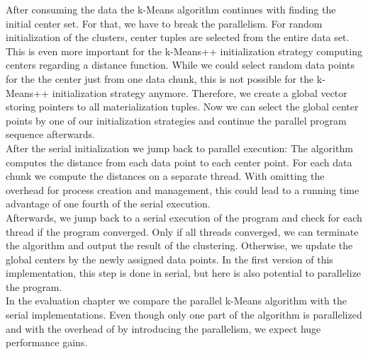 After consuming the data the k-Means algorithm continues with finding the initial center set. For that, we have to break the parallelism. For random initialization of the clusters, center tuples are selected from the entire data set. This is even more important for the k-Means++ initialization strategy computing centers regarding a distance function. While we could select random data points for the the center just from one data chunk, this is not possible for the k-Means++ initialization strategy anymore. Therefore, we create a global vector storing pointers to all materialization tuples. Now we can select the global center points by one of our initialization strategies and continue the parallel program sequence afterwards.
\\
After the serial initialization we jump back to parallel execution: The algorithm computes the distance from each data point to each center point. For each data chunk we compute the distances on a separate thread. With omitting the overhead for process creation and management, this could lead to a running time advantage of one fourth of the serial execution.
\\
Afterwards, we jump back to a serial execution of the program and check for each thread if the program converged. Only if all threads converged, we can terminate the algorithm and output the result of the clustering. Otherwise, we update the global centers by the newly assigned data points. In the first version of this implementation, this step is done in serial, but here is also potential to parallelize the program.
\\
In the evaluation chapter we compare the parallel k-Means algorithm with the serial implementations. Even though only one part of the algorithm is parallelized and with the overhead of by introducing the parallelism, we expect huge performance gains.





